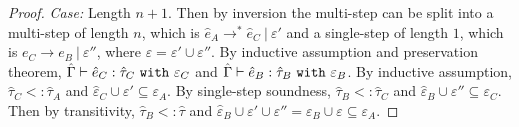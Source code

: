 \begin{appendix}
\begin{proof}
\textit{Case:} Length $n+1$. Then by inversion the multi-step can be split into a multi-step of length $n$, which is $\hat e_A \longrightarrow^{*} \hat e_C~|~\varepsilon'$ and a single-step of length $1$, which is $e_C \longrightarrow e_B~|~\varepsilon''$, where $\varepsilon = \varepsilon' \cup \varepsilon''$. By inductive assumption and preservation theorem, $\hat \Gamma \vdash \hat e_C: \hat \tau_C~\mathtt{with}~ \varepsilon_C$ and $\hat \Gamma \vdash \hat e_B: \hat \tau_B~\mathtt{with}~ \varepsilon_B$. By inductive assumption, $\hat \tau_C <: \hat \tau_A$ and $\hat \varepsilon_C \cup \varepsilon' \subseteq \varepsilon_A$. By single-step soundness, $\hat \tau_B <: \hat \tau_C$ and $\hat \varepsilon_B \cup \varepsilon'' \subseteq \varepsilon_C$. Then by transitivity, $\hat \tau_B <: \hat \tau$ and $\hat \varepsilon_B \cup \varepsilon' \cup \varepsilon'' = \varepsilon_B \cup \varepsilon \subseteq \varepsilon_A$.
\end{proof}

\end{appendix}
